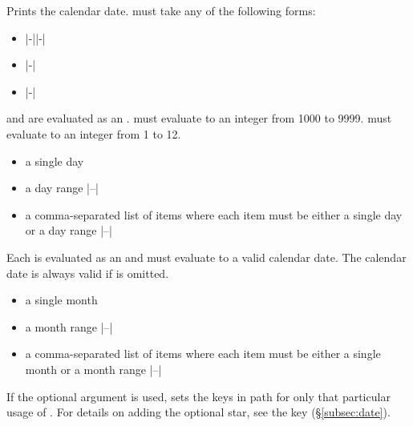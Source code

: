 \documentclass{beery}
\begin{document}
\begin{function}{\calendardate}
  \begin{syntax}
     \sarg{}  
  \end{syntax}
  \listheading
    {
      Prints the calendar date.
       must take any of the following forms:
    }
  \begin{itemize}
    \item {}|-||-|
    \item {}|-|
    \item {}|-|
  \end{itemize}

   and  are evaluated as an .
   must evaluate to an integer from \num{1000} to \num{9999}.
   must evaluate to an integer from \num{1} to \num{12}.

  \begin{itemize}
    \item a single day 
    \item a day range |--|
    \item a comma-separated list of items where each item must be either a single day  or a day range |--|
  \end{itemize}
  Each  is evaluated as an  and must evaluate to a valid calendar date.
  The calendar date  is always valid if  is omitted.

  \begin{itemize}
    \item a single month 
    \item a month range |--|
    \item a comma-separated list of items where each item must be either a single month  or a month range |--|
  \end{itemize}

  If the optional argument is used,  sets the keys in path  for only that particular usage of .
  For details on adding the optional star, see the key  (\S\ref{subsec:date}).
\end{function}
\end{document}
